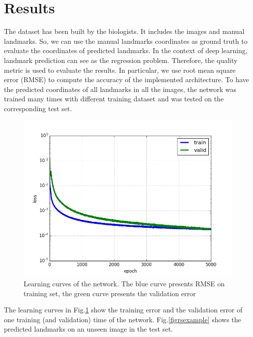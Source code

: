 \documentclass[conference]{IEEEtran}
\begin{document}
\section{Results}
The dataset has been built by the biologists. It includes the images and manual landmarks. So, we can use the manual landmarks coordinates as ground truth to evaluate the coordinates of predicted landmarks. In the context of deep learning, landmark prediction can see as the regression problem. Therefore, the quality metric is used to evaluate the results. In particular, we use root mean square error (RMSE) to compute the accuracy of the implemented architecture. To have the predicted coordinates of all landmarks in all the images, the network was trained many times with different training dataset and was tested on the corresponding test set.

\begin{figure}[htbp]
	\centerline{\includegraphics[scale=0.35]{images/loss_v16}}
	\caption{Learning curves of the network. The blue curve presents RMSE on training set, the green curve presents the validation error}
	\label{figloss}
\end{figure}

The learning curves in Fig.\ref{figloss} show the training error and the validation error of one training (and validation) time of the network. Fig.\ref{figrsexample} shows the predicted landmarks on an unseen image in the test set.
\end{document}
